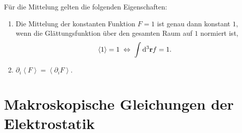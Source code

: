 Für die Mittelung gelten die folgenden Eigenschaften:\begin{enumerate}
	\item Die Mittelung der konstanten Funktion $F=1$ ist genau dann konstant $1$, wenn die Glättungsfunktion über den gesamten Raum auf $1$ normiert ist,
	      \begin{equation*}
		      \left\langle 1\right\rangle =1\;\Leftrightarrow\; \int \mathop{}\!\mathrm{d} ^{3}\mathbf{r}f=1.
	      \end{equation*}
	\item $\partial _{i}\left\langle F\right\rangle =\left\langle \partial _{i}F\right\rangle $.
\end{enumerate}

\section{Makroskopische Gleichungen der Elektrostatik\label{sec:Makroskopische_Gleichungen_der_Elektrostatik}}

